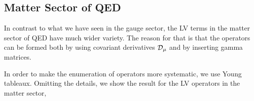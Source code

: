 \documentclass[12pt,preprintnumbers,nofootinbib]{revtex4}
\begin{document}
\subsection{Matter Sector of QED}

	In contrast to what we have seen in the gauge sector, 
	the LV terms in the matter sector of QED have much
	wider variety.
	The reason for that is that the operators can be formed both
	by using covariant derivatives $ \cal{D}_\mu $ and by 
	inserting gamma matrices.
	
	In order to make the enumeration of operators more systematic, we use 
     Young tableaux.
	Omitting the details, we show the result for the LV operators
	in the matter sector, 
\end{document}
